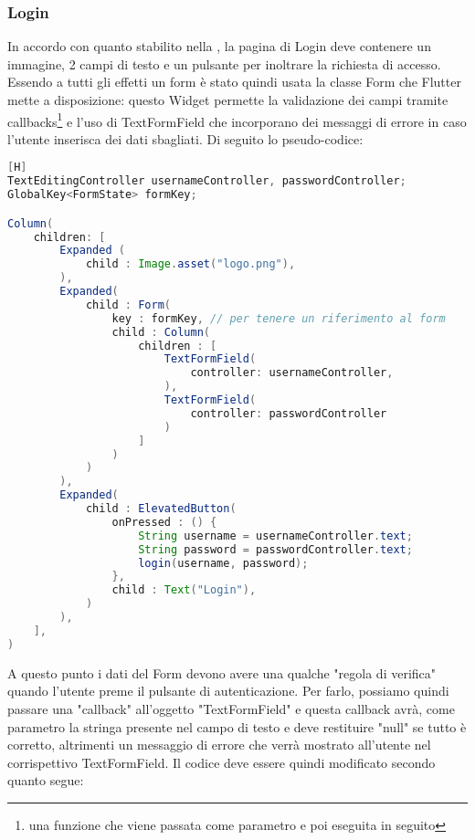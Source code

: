 \subsubsection{Login}
In accordo con quanto stabilito nella , la pagina di Login deve contenere un immagine, 2 campi di testo e un pulsante per inoltrare la richiesta di accesso.
Essendo a tutti gli effetti un form è stato quindi usata la classe Form che Flutter mette a disposizione: questo Widget permette la validazione dei campi tramite callbacks\footnote{una funzione che viene passata come parametro e poi eseguita in seguito} e l'uso di TextFormField che incorporano dei messaggi di errore in caso l'utente inserisca dei dati sbagliati. Di seguito lo pseudo-codice:
\begin{lstlisting}[language=Java, firstnumber=1][H]
TextEditingController usernameController, passwordController;
GlobalKey<FormState> formKey;

Column(
	children: [
		Expanded (
			child : Image.asset("logo.png"),
		),
		Expanded(
			child : Form(
				key : formKey, // per tenere un riferimento al form
				child : Column(
					children : [
						TextFormField(
							controller: usernameController,
						),
						TextFormField(
							controller: passwordController
						)
					]
				)
			)
		),
		Expanded(
			child : ElevatedButton(
				onPressed : () {
					String username = usernameController.text;
					String password = passwordController.text;
					login(username, password);
				},
				child : Text("Login"),
			)
		),
	],
)
\end{lstlisting}
A questo punto i dati del Form devono avere una qualche "regola di verifica" quando l'utente preme il pulsante di autenticazione. Per farlo, possiamo quindi passare una "callback" all'oggetto "TextFormField" e questa callback avrà, come parametro la stringa presente nel campo di testo e deve restituire "null" se tutto è corretto, altrimenti un messaggio di errore che verrà mostrato all'utente nel corrispettivo TextFormField. Il codice deve essere quindi modificato secondo quanto segue:
